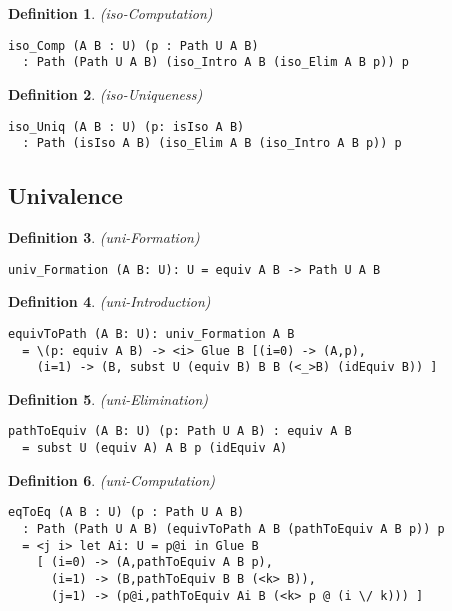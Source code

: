 \documentclass{article}
\newtheorem{definition}{Definition}
\begin{document}
\begin{definition} (iso-Computation)
\begin{lstlisting}
iso_Comp (A B : U) (p : Path U A B)
  : Path (Path U A B) (iso_Intro A B (iso_Elim A B p)) p
\end{lstlisting}
\end{definition}

\begin{definition} (iso-Uniqueness)
\begin{lstlisting}
iso_Uniq (A B : U) (p: isIso A B)
  : Path (isIso A B) (iso_Elim A B (iso_Intro A B p)) p
\end{lstlisting}
\end{definition}

\newpage
\subsection{Univalence}

\begin{definition} (uni-Formation)
\begin{lstlisting}
univ_Formation (A B: U): U = equiv A B -> Path U A B
\end{lstlisting}
\end{definition}

\begin{definition} (uni-Introduction)
\begin{lstlisting}
equivToPath (A B: U): univ_Formation A B
  = \(p: equiv A B) -> <i> Glue B [(i=0) -> (A,p),
    (i=1) -> (B, subst U (equiv B) B B (<_>B) (idEquiv B)) ]
\end{lstlisting}
\end{definition}

\begin{definition} (uni-Elimination)
\begin{lstlisting}
pathToEquiv (A B: U) (p: Path U A B) : equiv A B
  = subst U (equiv A) A B p (idEquiv A)
\end{lstlisting}
\end{definition}

\begin{definition} (uni-Computation)
\begin{lstlisting}
eqToEq (A B : U) (p : Path U A B)
  : Path (Path U A B) (equivToPath A B (pathToEquiv A B p)) p
  = <j i> let Ai: U = p@i in Glue B
    [ (i=0) -> (A,pathToEquiv A B p),
      (i=1) -> (B,pathToEquiv B B (<k> B)),
      (j=1) -> (p@i,pathToEquiv Ai B (<k> p @ (i \/ k))) ]

\end{lstlisting}
\end{definition}
\end{document}
